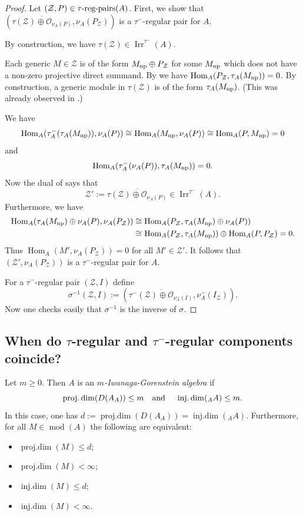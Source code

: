 \documentclass[12pt,reqno]{amsart}
\theoremstyle{definition}
\newcommand{\cO}{{\mathcal O}}
\newcommand{\md}{\operatorname{mod}}
\newcommand{\pdim}{\operatorname{proj.dim}}
\newcommand{\idim}{\operatorname{inj.dim}}
\newcommand{\Hom}{\operatorname{Hom}}
\newcommand{\irr}{\operatorname{Irr}}
\newcommand{\calZ}{\mathcal{Z}}
\begin{document}
\begin{proof}
Let $(\calZ,P)\in \tau\text{\rm-reg-pairs}(A)$.
First, we show that
$(\overline{\tau(\calZ) \oplus \cO_{\nu_A(P)}},\nu_A(P_{\calZ}))$
is a $\tau^-$-regular pair for $A$.

By construction, we have $\tau(\calZ) \in \irr^{\tau^-}(A)$.

Each generic $M \in \calZ$ is of the form
$M_{\rm np} \oplus P_\calZ$ for some $M_{\rm np}$ which does
not have a non-zero projective direct summand.
By \cite[Theorem~1.3]{CLS15} we have
$\Hom_A(P_\calZ,\tau_A(M_{\rm np})) = 0$.
By construction,
a generic module in $\tau(\calZ)$ is of the form
$\tau_A(M_{\rm np})$.
(This was already observed in \cite[Theorem~3.11(2)]{F23}.)

We have
$$
\Hom_A(\tau_A^-(\tau_A(M_{\rm np})),\nu_A(P))
\cong \Hom_A(M_{\rm np},\nu_A(P)) \cong \Hom_A(P,M_{\rm np}) = 0
$$
and
$$
\Hom_A(\tau_A^-(\nu_A(P)),\tau_A(M_{\rm np})) = 0.
$$
Now the dual of \cite[Theorem~1.3]{CLS15} says that
$$
\calZ' :=
\overline{\tau(\calZ) \oplus \cO_{\nu_A(P)}} \in \irr^{\tau^-}(A).
$$
Furthermore, we have
\begin{align*}
\Hom_A(\tau_A(M_{\rm np}) \oplus \nu_A(P),\nu_A(P_\calZ))
&\cong \Hom_A(P_\calZ,\tau_A(M_{\rm np}) \oplus \nu_A(P))
\\
&\cong  \Hom_A(P_\calZ,\tau_A(M_{\rm np})) \oplus \Hom_A(P,P_\calZ) = 0.
\end{align*}
Thus $\Hom_A(M',\nu_A(P_\calZ)) = 0$ for all $M' \in \calZ'$.
It follows that
$(\calZ',\nu_A(P_\calZ))$ is
a $\tau^-$-regular pair for $A$.

For a $\tau^-$-regular pair $(\calZ,I)$ define
$$
\sigma^{-1}(\calZ,I) :=
(\overline{\tau^-(\calZ) \oplus \cO_{\nu_A^-(I)}},\nu_A^-(I_\calZ)).
$$
Now one checks easily that $\sigma^{-1}$ is the inverse of
$\sigma$.
\end{proof}





\subsection{When do $\tau$-regular and $\tau^-$-regular components coincide?}
Let $m \ge 0$.
Then $A$ is an
\emph{$m$-Iwanaga-Gorenstein algebra} if
$$
\pdim(D(A_A)) \le m
\text{\quad and \quad}
\idim({_A}A) \le m.
$$
In this case, one has
$d := \pdim(D(A_A)) = \idim({_A}A)$.
Furthermore, for all $M \in \md(A)$ the following are equivalent:
\begin{itemize}\itemsep2mm
\item $\pdim(M) \le d$;
\item $\pdim(M) < \infty$;
\item $\idim(M) \le d$;
\item $\idim(M) < \infty$.
\end{itemize}
\end{document}
